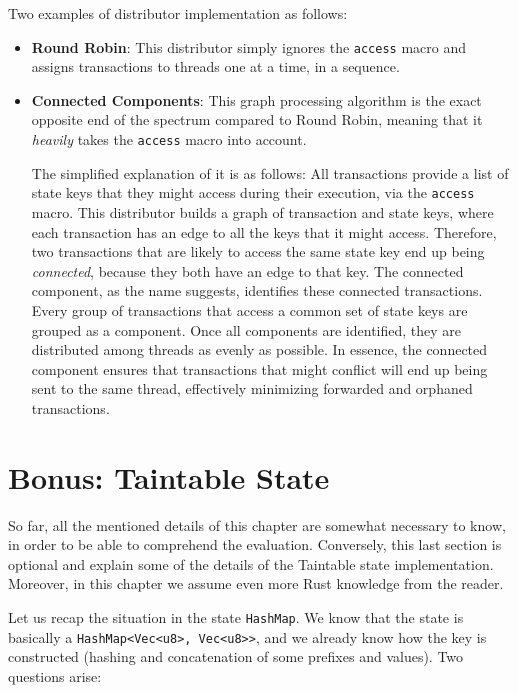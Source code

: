 Two examples of distributor implementation as follows:

\begin{itemize}
	\item \textbf{Round Robin}: This distributor simply ignores the \texttt{access} macro and
	assigns transactions to threads one at a time, in a sequence.
	\item \textbf{Connected Components}\cite{nuutilaFindingStronglyConnected1994}: This graph
	processing algorithm is the exact opposite end of the spectrum compared to Round Robin, meaning
	that it \textit{heavily} takes the \texttt{access} macro into account.

	The simplified explanation of it is as follows: All transactions provide a list of state keys
	that they might access during their execution, via the \texttt{access} macro. This distributor
	builds a graph of transaction and state keys, where each transaction has an edge to all the keys
	that it might access. Therefore, two transactions that are likely to access the same state key
	end up being \textit{connected}, because they both have an edge to that key. The connected
	component, as the name suggests, identifies these connected transactions. Every group of
	transactions that access a common set of state keys are grouped as a component. Once all
	components are identified, they are distributed among threads as evenly as possible. In essence,
	the connected component ensures that transactions that might conflict will end up being sent to
	the same thread, effectively minimizing forwarded and orphaned transactions.
\end{itemize}

\section{Bonus: Taintable State} \label{chap_impl:sec:bonus}

So far, all the mentioned details of this chapter are somewhat necessary to know, in order to be
able to comprehend the evaluation. Conversely, this last section is optional and explain some of the
details of the Taintable state implementation. Moreover, in this chapter we assume even more Rust
knowledge from the reader.

Let us recap the situation in the state \texttt{HashMap}. We know that the state is basically a
\texttt{HashMap<Vec<u8>, Vec<u8>>}, and we already know how the key is constructed (hashing and
concatenation of some prefixes and values). Two questions arise:

